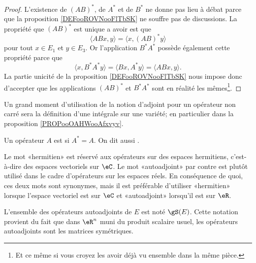 \begin{proof}
    L'existence de \( (AB)^*\), de \( A^*\) et de \( B^*\) ne donne pas lieu à débat parce que la proposition \ref{DEFooROVNooFlTbSK} ne souffre pas de discussions. La propriété que \( (AB)^*\) est unique a avoir est que
    \begin{equation}
        \langle ABx, y\rangle =\langle x, (AB)^*y\rangle 
    \end{equation}
    pour tout \( x\in E_1\) et \( y\in E_3\). Or l'application \( B^*A^*\) possède également cette propriété parce que
    \begin{equation}
        \langle x, B^*A^*y\rangle =\langle Bx, A^*y\rangle =\langle ABx, y\rangle .
    \end{equation}
    La partie unicité de la proposition \ref{DEFooROVNooFlTbSK} nous impose donc d'accepter que les applications \( (AB)^*\) et \( B^*A^*\) sont en réalité les mêmes\footnote{Et ce même si vous croyez les avoir déjà vu ensemble dans la même pièce.}.
\end{proof}

\begin{normaltext}
    Un grand moment d'utilisation de la notion d'adjoint pour un opérateur non carré sera la définition d'une intégrale sur une variété; en particulier dans la proposition \ref{PROPooOAHWooAfxvyv}.
\end{normaltext}

\begin{definition}      \label{DEFooKEBHooWwCKRK}
    Un opérateur \( A\) est  si \( A^*=A\). On dit aussi .
\end{definition}

\begin{normaltext}
    Le mot «hermitien» est réservé aux opérateurs sur des espaces hermitiens, c'est-à-dire des espaces vectoriels sur \( \eC\). Le mot «autoadjoint» par contre est plutôt utilisé dans le cadre d'opérateurs sur les espaces réels. En conséquence de quoi, ces deux mots sont synonymes, mais il est préférable d'utiliser «hermitien» lorsque l'espace vectoriel est sur \( \eC\) et «autoadjoint» lorsqu'il est sur \( \eR\).

    L'ensemble des opérateurs autoadjoints de \( E\) est noté \( \gS(E)\). Cette notation provient du fait que dans \( \eR^n\) muni du produit scalaire usuel, les opérateurs autoadjoints sont les matrices symétriques.
\end{normaltext}

